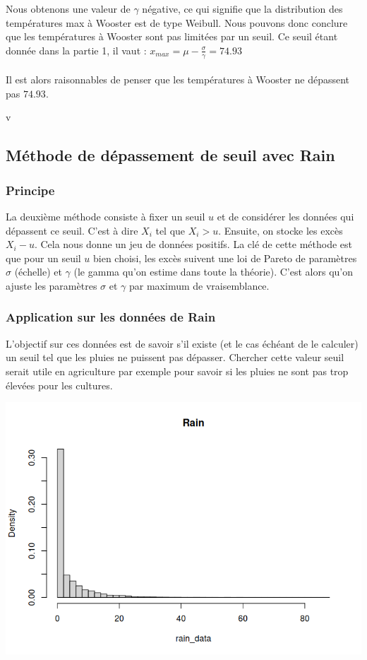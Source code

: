 \documentclass{article}
\begin{document}
Nous obtenons une valeur de $\gamma$ négative, ce qui signifie que la distribution des températures max à Wooster est de type Weibull.
Nous pouvons donc conclure que les températures à Wooster sont pas limitées par un seuil.
Ce seuil étant donnée dans la partie 1, il vaut : $x_{max} = \mu - \frac{\sigma}{\gamma} = 74.93 $
\\
\\
Il est alors raisonnables de penser que les températures à Wooster ne dépassent pas $74.93$.

v
\subsection{Méthode de dépassement de seuil avec \textbf{Rain}}

\subsubsection{Principe}

La deuxième méthode consiste à fixer un seuil $u$ et de considérer les données qui dépassent ce seuil. C'est à dire $X_i$ tel que $X_i > u$.
Ensuite, on stocke les excès $X_i - u$. Cela nous donne un jeu de données positifs.
La clé de cette méthode est que pour un seuil $u$ bien choisi, les excès suivent une loi de Pareto de paramètres $\sigma$ (échelle) et $\gamma$ (le gamma qu'on estime dans toute la théorie).
C'est alors qu'on ajuste les paramètres $\sigma$ et $\gamma$ par maximum de vraisemblance.

\subsubsection{Application sur les données de Rain}

L'objectif sur ces données est de savoir s'il existe (et le cas échéant de le calculer) un seuil tel que les pluies ne puissent pas dépasser.
Chercher cette valeur seuil serait utile en agriculture par exemple pour savoir si les pluies ne sont pas trop élevées pour les cultures.

\begin{center}
	\includegraphics[scale=0.8]{./images/rainhisto.png} 
\end{center}
\end{document}

